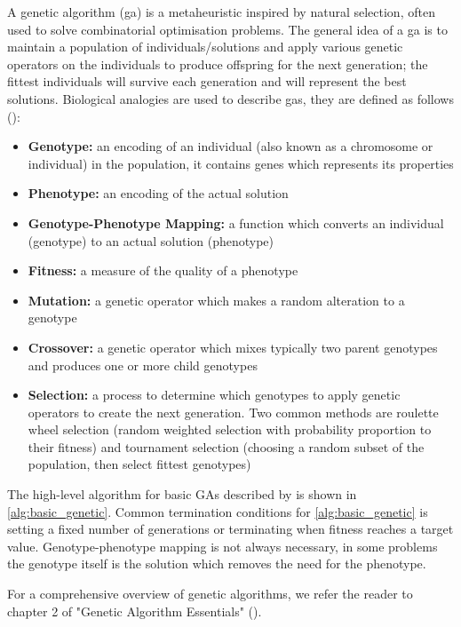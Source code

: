 A genetic algorithm (\acrshort{ga}) is a \gls{metaheuristic} inspired by natural selection, often used to solve combinatorial optimisation problems. The general idea of a \acrshort{ga} is to maintain a population of individuals/solutions and apply various genetic operators on the individuals to produce offspring for the next generation; the fittest individuals will survive each generation and will represent the best solutions. Biological analogies are used to describe \acrshort{ga}s, they are defined as follows (\cite{kramer_genetic_2017}):
\begin{itemize}
    \item \textbf{Genotype:} an encoding of an individual (also known as a chromosome or individual) in the population, it contains genes which represents its properties
    \item \textbf{Phenotype:} an encoding of the actual solution
    \item \textbf{Genotype-Phenotype Mapping:} a function which converts an individual (genotype) to an actual solution (phenotype)
    \item \textbf{Fitness:} a measure of the quality of a phenotype
    \item \textbf{Mutation:} a genetic operator which makes a random alteration to a genotype
    \item \textbf{Crossover:} a genetic operator which mixes typically two parent genotypes and produces one or more child genotypes
    \item \textbf{Selection:} a process to determine which genotypes to apply genetic operators to create the next generation. Two common methods are roulette wheel selection (random weighted selection with probability proportion to their fitness) and tournament selection (choosing a random subset of the population, then select fittest genotypes)
\end{itemize}

The high-level algorithm for basic GAs described by \textcite{kramer_genetic_2017} is shown in \cref{alg:basic_genetic}. Common termination conditions for \cref{alg:basic_genetic} is setting a fixed number of generations or terminating when fitness reaches a target value. Genotype-phenotype mapping is not always necessary, in some problems the genotype itself is the solution which removes the need for the phenotype.



For a comprehensive overview of genetic algorithms, we refer the reader to chapter 2 of "Genetic Algorithm Essentials" (\cite{kramer_genetic_2017}).

